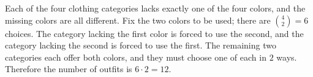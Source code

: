 Each of the four clothing categories lacks exactly one of the four colors, and the missing colors are all different. Fix the two colors to be used; there are $\binom42=6$ choices. The category lacking the first color is forced to use the second, and the category lacking the second is forced to use the first. The remaining two categories each offer both colors, and they must choose one of each in $2$ ways. Therefore the number of outfits is $\boxed{6\cdot2=12}$.
